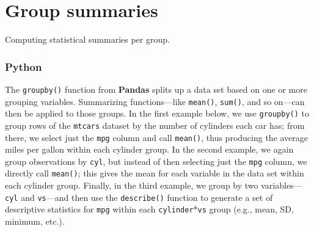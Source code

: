 \documentclass[
]{book}
\newenvironment{Shaded}{\begin{snugshade}}{\end{snugshade}}
\newcommand{\AttributeTok}[1]{\textcolor[rgb]{0.77,0.63,0.00}{#1}}
\newcommand{\DecValTok}[1]{\textcolor[rgb]{0.00,0.00,0.81}{#1}}
\newcommand{\FunctionTok}[1]{\textcolor[rgb]{0.00,0.00,0.00}{#1}}
\newcommand{\NormalTok}[1]{#1}
\newcommand{\SpecialCharTok}[1]{\textcolor[rgb]{0.00,0.00,0.00}{#1}}
\begin{document}
\begin{Shaded}
\end{Shaded}

\hypertarget{group-summaries}{%
\section{Group summaries}\label{group-summaries}}

Computing statistical summaries per group.

\hypertarget{python-37}{%
\subsubsection*{Python}\label{python-37}}

The \texttt{groupby()} function from \textbf{Pandas} splits up a data set based on one or more grouping variables. Summarizing functions---like \texttt{mean()}, \texttt{sum()}, and so on---can then be applied to those groups. In the first example below, we use \texttt{groupby()} to group rows of the \texttt{mtcars} dataset by the number of cylinders each car has; from there, we select just the \texttt{mpg} column and call \texttt{mean()}, thus producing the average miles per gallon within each cylinder group. In the second example, we again group observations by \texttt{cyl}, but instead of then selecting just the \texttt{mpg} column, we directly call \texttt{mean()}; this gives the mean for each variable in the data set within each cylinder group. Finally, in the third example, we group by two variables---\texttt{cyl} and \texttt{vs}---and then use the \texttt{describe()} function to generate a set of descriptive statistics for \texttt{mpg} within each \texttt{cylinder}*\texttt{vs} group (e.g., mean, SD, minimum, etc.).
\end{document}
